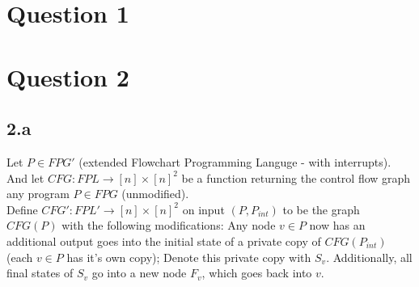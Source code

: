 \documentclass{article}
\begin{document}
\author{Yosef Goren}
\title{}
\maketitle

\section*{Question 1}

\section*{Question 2}
\subsection*{2.a}
Let $P\in FPG'$ (extended Flowchart Programming Languge - with interrupts).\\
And let $CFG:FPL\longrightarrow [n]\times [n]^2$ be a function returning
the control flow graph any program $P\in FPG$ (unmodified).\\

Define $CFG':FPL'\longrightarrow [n]\times [n]^2$ on input $(P,P_{int})$ to be the graph
$CFG(P)$ with the following modifications:
Any node $v\in P$ now has an additional output
goes into the initial
state of a private copy of $CFG(P_{int})$
(each $v\in P$ has it's own copy); Denote this private
copy with $S_v$. Additionally, all final states of $S_v$ go 
into a new node $F_v$, which goes back into $v$.\\
\end{document}
